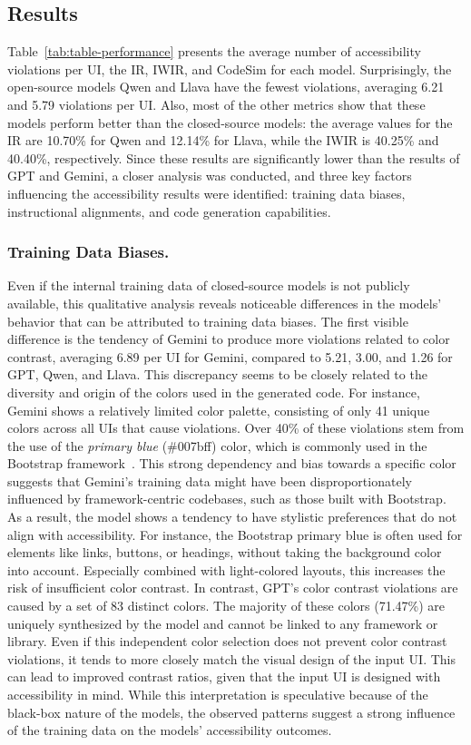 \subsection{Results}
Table~\ref{tab:table-performance} presents the average 
number of accessibility violations per UI, the IR, IWIR, and 
CodeSim for each model. Surprisingly, the open-source models
Qwen and Llava have the fewest violations, averaging 
6.21 and 5.79 violations per UI. Also, most of the other metrics 
show that these models perform better than the closed-source
models: the average values for the IR are 10.70\% for Qwen and
12.14\% for Llava, while the IWIR is 40.25\%
and 40.40\%, respectively.
Since these results 
are significantly lower than the results of GPT and Gemini, 
a closer analysis was conducted, and three key factors 
influencing the accessibility results were identified: 
training data biases, instructional alignments, and 
code generation capabilities.


\subsubsection{Training Data Biases.} Even if the 
internal training data of closed-source models is not publicly 
available, this qualitative analysis reveals noticeable differences 
in the models' behavior that can be attributed to training 
data biases.\newline
The first visible difference is the tendency of Gemini to produce 
more violations related to color contrast, averaging 
6.89 per UI for Gemini, compared to 5.21, 3.00, and 1.26 for GPT,
Qwen, and Llava. This discrepancy seems to be closely related to 
the diversity and origin of the colors used in the generated code.
For instance, Gemini shows a relatively limited color palette, 
consisting of only 41 unique colors across all UIs that cause 
violations. Over 40\% of these violations stem from the use 
of the \textit{primary blue} (\#007bff) color, which is 
commonly used in the Bootstrap framework~\cite{web:bootstrapv4}.
This strong dependency and bias towards a specific color suggests 
that Gemini's training data might have been disproportionately 
influenced by framework-centric codebases, such as those built 
with Bootstrap. As a result, the model shows a tendency to have 
stylistic preferences that do not align with accessibility.
For instance, the Bootstrap primary blue is often used for 
elements like links, buttons, or headings, without taking the 
background color into account. Especially combined with 
light-colored layouts, this increases the risk of insufficient 
color contrast. In contrast, GPT's color contrast violations are 
caused by a set of 83 distinct colors. The majority of these 
colors (71.47\%) are uniquely synthesized by the model and cannot 
be linked to any framework or library. Even if this 
independent color selection does not prevent color contrast 
violations, it tends to more closely match the visual 
design of the input UI. This can lead to improved contrast ratios,
given that the input UI is designed with accessibility in mind.
While this interpretation is speculative because of the 
black-box nature of the models, the observed patterns suggest 
a strong influence of the training data on the models' accessibility
outcomes.

